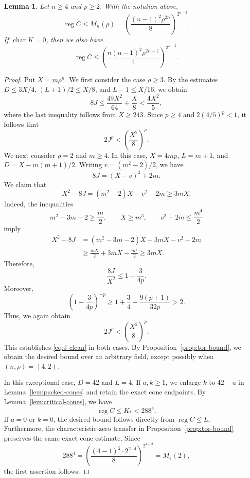 \documentclass[12pt]{amsart}
\numberwithin{equation}{section}
\newtheorem{lemma}[theorem]{Lemma}
\theoremstyle{definition}
\theoremstyle{remark}
\numberwithin{equation}{section}
\DeclareMathOperator{\reg}{reg}
\begin{document}
\begin{lemma}\label{lem:explicit-regularity}
Let $n\ge4$ and $\rho\ge2$. With the notation above,
\[
 \reg C\le M_n(\rho)
 =\left(\frac{(n-1)^2\rho^{2n}}8\right)^{2^{n-2}}.
\]
If $\operatorname{char}K=0$, then we also have
\[
 \reg C\le
 \left(\frac{n(n-1)^2\rho^{2n-1}}4\right)^{2^{n-2}}.
\]
\end{lemma}
\begin{proof} 	Put $X=m\rho^n$. We first consider the case $\rho\ge3$. By the estimates $D\le3X/4$, $(L+1)/2\le X/8$, and $L-1\le X/16$,
	we obtain
	\[
	8J\le\frac{49X^2}{64}+\frac X8<\frac{4X^2}{5},
	\]
	where the last inequality follows from $X\ge243$. Since $p\ge4$ and $2(4/5)^p<1$, it follows that
	\begin{equation}\label{eq:J-clean}
		2J^p<\left(\frac{X^2}{8}\right)^p.
	\end{equation}
	We next consider $\rho=2$ and $m\ge4$. In this case, $X=4mp$, $L=m+1$, and $D=X-m(m+1)/2$. Writing $v=(m^2-2)/2$, we have
	\[
	8J=(X-v)^2+2m.
	\]
We claim that
\[
 X^2-8J=(m^2-2)X-v^2-2m\ge3mX.
\]
Indeed, the inequalities
\[
 m^2-3m-2\ge\frac m2,\qquad
 X\ge m^3,\qquad
 v^2+2m\le\frac{m^4}{2}
\]
imply
\[
 \begin{aligned}
 X^2-8J
 &= (m^2-3m-2)X
    +3mX-v^2-2m\\
 &\ge \frac{mX}{2}+3mX-\frac{m^4}{2}\ge 3mX.
 \end{aligned}
\]
Therefore,
\[
 \frac{8J}{X^2}\le1-\frac{3}{4p}.
\]
Moreover,
\[
 \left(1-\frac{3}{4p}\right)^{-p}
 \ge1+\frac34+\frac{9(p+1)}{32p}>2.
\]
Thus, we again obtain
\[
 2J^p<\left(\frac{X^2}{8}\right)^p.
\]
This establishes \eqref{eq:J-clean} in both cases. By Proposition~\ref{prop:tor-bound}, we obtain the desired
bound over an arbitrary field, except possibly when
$(n,\rho)=(4,2)$.

In this exceptional case, $D=42$ and $L=4$. If $a,k\ge1$, we enlarge $k$ to $42-a$ in Lemma~\ref{lem:packed-cones} and retain the exact cone
endpoints. By Lemma~\ref{lem:critical-cones}, we have
\[
 \reg C\le K_*<288^4.
\]
If $a=0$ or $k=0$, the desired bound follows directly from $\reg C\le L$. Furthermore, the characteristic-zero transfer
in Proposition~\ref{prop:tor-bound} preserves the same exact cone estimate. Since
\[
 288^4=\left(\frac{(4-1)^2\cdot2^{2\cdot4}}8\right)^{2^{4-2}}=M_4(2),
\]
the first assertion follows.


\end{proof}
\end{document}
